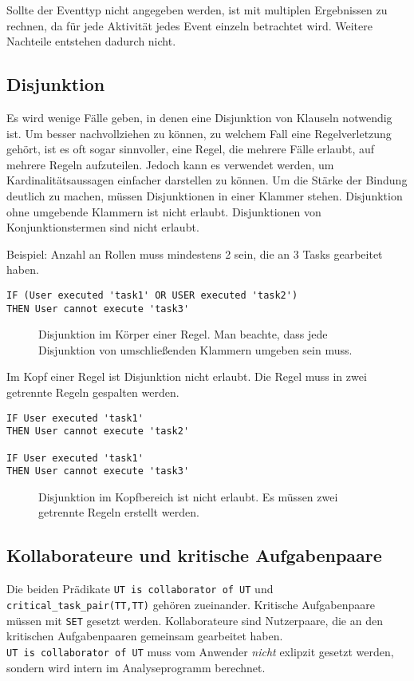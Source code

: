Sollte der Eventtyp nicht angegeben werden, ist mit multiplen Ergebnissen zu rechnen, da für jede Aktivität jedes Event einzeln betrachtet wird. Weitere Nachteile entstehen dadurch nicht.

\subsection{Disjunktion}
\label{sec:disjunction}
Es wird wenige Fälle geben, in denen eine Disjunktion von Klauseln notwendig ist. Um besser nachvollziehen zu können, zu welchem Fall eine Regelverletzung gehört, ist es oft sogar sinnvoller, eine Regel, die mehrere Fälle erlaubt, auf mehrere Regeln aufzuteilen. Jedoch kann es verwendet werden, um Kardinalitätsaussagen einfacher darstellen zu können. Um die Stärke der Bindung deutlich zu machen, müssen Disjunktionen in einer Klammer stehen. Disjunktion ohne umgebende Klammern ist nicht erlaubt. Disjunktionen von Konjunktionstermen sind nicht erlaubt.

Beispiel: Anzahl an Rollen muss mindestens 2 sein, die an 3 Tasks gearbeitet haben.

\begin{verbatim}
IF (User executed 'task1' OR USER executed 'task2')
THEN User cannot execute 'task3'
\end{verbatim}
\begin{figure}[!h]
\caption{Disjunktion im Körper einer Regel. Man beachte, dass jede Disjunktion von umschließenden Klammern umgeben sein muss.}
\label{fig:disjunction1}
\end{figure}

Im Kopf einer Regel ist Disjunktion nicht erlaubt. Die Regel muss in zwei getrennte Regeln gespalten werden.

\begin{verbatim}
IF User executed 'task1'
THEN User cannot execute 'task2'

IF User executed 'task1'
THEN User cannot execute 'task3'
\end{verbatim}
\begin{figure}[!h]
\caption{Disjunktion im Kopfbereich ist nicht erlaubt. Es müssen zwei getrennte Regeln erstellt werden.}
\label{fig:disjunction2}
\end{figure}

\subsection{Kollaborateure und kritische Aufgabenpaare}
Die beiden Prädikate \texttt{UT is collaborator of UT} und \texttt{critical\_task\_pair(TT,TT)} gehören zueinander.
Kritische Aufgabenpaare müssen mit \texttt{SET} gesetzt werden. Kollaborateure sind Nutzerpaare, die an den kritischen Aufgabenpaaren gemeinsam gearbeitet haben.
\\\texttt{UT is collaborator of UT} muss vom Anwender \textit{nicht} exlipzit gesetzt werden, sondern wird intern im Analyseprogramm berechnet. 

